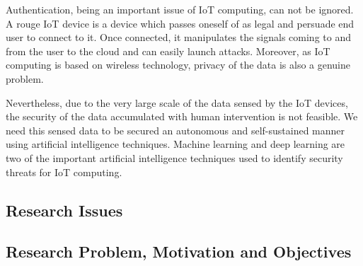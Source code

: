\documentclass[10pt]{llncs}
\begin{document}
Authentication, being an important issue of IoT computing, can not be ignored. A rouge IoT device is a device which passes oneself of as legal and persuade end user to connect to it. Once connected, it manipulates the signals coming to and from the user to the cloud and can easily launch attacks. Moreover, as IoT computing is based on wireless technology, privacy of the data is also a genuine problem. 

Nevertheless, due to the very large scale of the data sensed by the IoT devices, the security of the data accumulated with human intervention is not feasible. We need this sensed data to be secured an autonomous and self-sustained manner using artificial intelligence techniques. Machine learning and deep learning are two of the important artificial intelligence techniques used to identify security threats for IoT computing.

%

%


%


%



%
\subsection{Research Issues}


%


%


%


%
\subsection{Research Problem, Motivation and Objectives}
\end{document}
